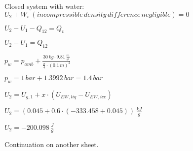 Closed system with water:  
\( U_2 + W_{v} \, (incompressible \, density \, difference \, negligible) = 0 \)  

\( U_2 - U_1 - Q_{12} = Q_{v} \)  

\( U_2 - U_1 = Q_{12} \)  

\( p_w = p_{amb} + \frac{30 \, kg \cdot 9.81 \, \frac{m}{s^2}}{\frac{\pi}{4} \cdot (0.1 \, m)^2} \)  

\( p_w = 1 \, bar + 1.3992 \, bar = 1.4 \, bar \)  

\( U_2 = U_{g,1} + x \cdot (U_{EW,liq} - U_{EW,ice}) \)  

\( U_2 = (0.045 + 0.6 \cdot (-333.458 + 0.045)) \, \frac{kJ}{g} \)  

\( U_2 = -200.098 \, \frac{J}{g} \)  

Continuation on another sheet.